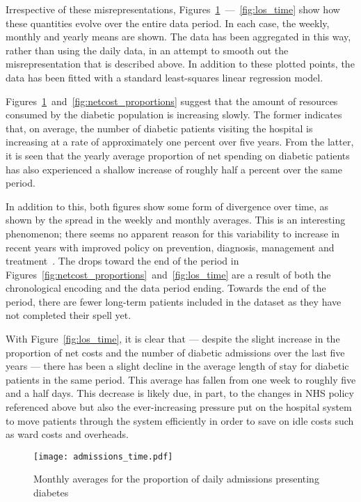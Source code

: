 Irrespective of these misrepresentations,
Figures~\ref{fig:admissions}~---~\ref{fig:los_time} show how these quantities
evolve over the entire data period. In each case, the weekly, monthly and yearly
means are shown. The data has been aggregated in this way, rather than using the
daily data, in an attempt to smooth out the misrepresentation that is described
above. In addition to these plotted points, the data has been fitted with a
standard least-squares linear regression model.

Figures~\ref{fig:admissions}~and~\ref{fig:netcost_proportions} suggest that the
amount of resources consumed by the diabetic population is increasing slowly.
The former indicates that, on average, the number of diabetic patients visiting
the hospital is increasing at a rate of approximately one percent over five
years. From the latter, it is seen that the yearly average proportion of net
spending on diabetic patients has also experienced a shallow increase of roughly
half a percent over the same period.

In addition to this, both figures show some form of divergence over time, as
shown by the spread in the weekly and monthly averages. This is an interesting
phenomenon; there seems no apparent reason for this variability to increase in
recent years with improved policy on prevention, diagnosis, management and
treatment~\cite{NHS:ltp,NICE,Penn2018,PHE}. The drops toward the end of the
period in Figures~\ref{fig:netcost_proportions}~and~\ref{fig:los_time} are a
result of both the chronological encoding and the data period ending. Towards
the end of the period, there are fewer long-term patients included in the
dataset as they have not completed their spell yet.

With Figure~\ref{fig:los_time}, it is clear that --- despite the slight increase
in the proportion of net costs and the number of diabetic admissions over the
last five years --- there has been a slight decline in the average length of
stay for diabetic patients in the same period. This average has fallen from one
week to roughly five and a half days. This decrease is likely due, in part, to
the changes in NHS policy referenced above but also the ever-increasing pressure
put on the hospital system to move patients through the system efficiently in
order to save on idle costs such as ward costs and overheads.

\begin{figure}
    \centering
    \texttt{[image: admissions\_time.pdf]}
    \caption{Monthly averages for the proportion of daily admissions presenting
        diabetes
    }\label{fig:admissions}
\end{figure}

